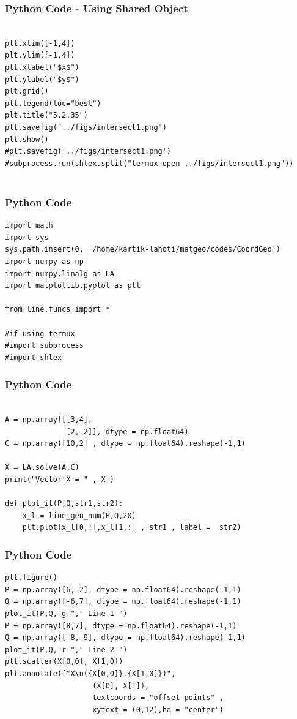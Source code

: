 \documentclass{beamer}
\begin{document}
\begin{frame}[fragile]
    \frametitle{Python Code - Using Shared Object}
    \begin{lstlisting}

plt.xlim([-1,4])
plt.ylim([-1,4])
plt.xlabel("$x$")
plt.ylabel("$y$")
plt.grid()
plt.legend(loc="best")
plt.title("5.2.35")
plt.savefig("../figs/intersect1.png")
plt.show()
#plt.savefig('../figs/intersect1.png')
#subprocess.run(shlex.split("termux-open ../figs/intersect1.png"))


\end{lstlisting}
\end{frame}

\begin{frame}[fragile]
    \frametitle{Python Code}
    \begin{lstlisting}
import math
import sys 
sys.path.insert(0, '/home/kartik-lahoti/matgeo/codes/CoordGeo')
import numpy as np
import numpy.linalg as LA
import matplotlib.pyplot as plt

from line.funcs import *

#if using termux
#import subprocess
#import shlex
\end{lstlisting}
\end{frame}

\begin{frame}[fragile]
    \frametitle{Python Code }
    \begin{lstlisting}

A = np.array([[3,4],
              [2,-2]], dtype = np.float64)
C = np.array([10,2] , dtype = np.float64).reshape(-1,1)

X = LA.solve(A,C)
print("Vector X = " , X ) 

def plot_it(P,Q,str1,str2):
    x_l = line_gen_num(P,Q,20)
    plt.plot(x_l[0,:],x_l[1,:] , str1 , label =  str2)

\end{lstlisting}
\end{frame}

\begin{frame}[fragile]
    \frametitle{Python Code }
    \begin{lstlisting}
plt.figure()
P = np.array([6,-2], dtype = np.float64).reshape(-1,1)
Q = np.array([-6,7], dtype = np.float64).reshape(-1,1)
plot_it(P,Q,"g-"," Line 1 ")
P = np.array([8,7], dtype = np.float64).reshape(-1,1)
Q = np.array([-8,-9], dtype = np.float64).reshape(-1,1)
plot_it(P,Q,"r-"," Line 2 ")
plt.scatter(X[0,0], X[1,0])
plt.annotate(f"X\n({X[0,0]},{X[1,0]})",
                    (X[0], X[1]),
                    textcoords = "offset points" ,
                    xytext = (0,12),ha = "center")
\end{lstlisting}
\end{frame}
\end{document}
